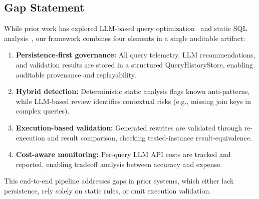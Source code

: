 \documentclass[conference]{IEEEtran}
\begin{document}
\subsection{Gap Statement}
While prior work has explored LLM-based query optimization~\cite{rbot2025,llmopt2025,llmsteer2024,lapuda2024,llm4hint2025} and static SQL analysis~\cite{sqlaudit,gcpantipattern,dwhauditor}, our framework combines four elements in a single auditable artifact:

\begin{enumerate}
    \item \textbf{Persistence-first governance:} All query telemetry, LLM recommendations, and validation results are stored in a structured QueryHistoryStore, enabling auditable provenance and replayability.
    \item \textbf{Hybrid detection:} Deterministic static analysis flags known anti-patterns, while LLM-based review identifies contextual risks (e.g., missing join keys in complex queries).
    \item \textbf{Execution-based validation:} Generated rewrites are validated through re-execution and result comparison, checking tested-instance result-equivalence.
    \item \textbf{Cost-aware monitoring:} Per-query LLM API costs are tracked and reported, enabling tradeoff analysis between accuracy and expense.
\end{enumerate}

This end-to-end pipeline addresses gaps in prior systems, which either lack persistence, rely solely on static rules, or omit execution validation.

\begin{table}[t]
\caption{Rule-Based vs. LLM-Assisted Coverage}
\label{tab:rulebased}
\centering
\small
{}
\end{table}
\end{document}
